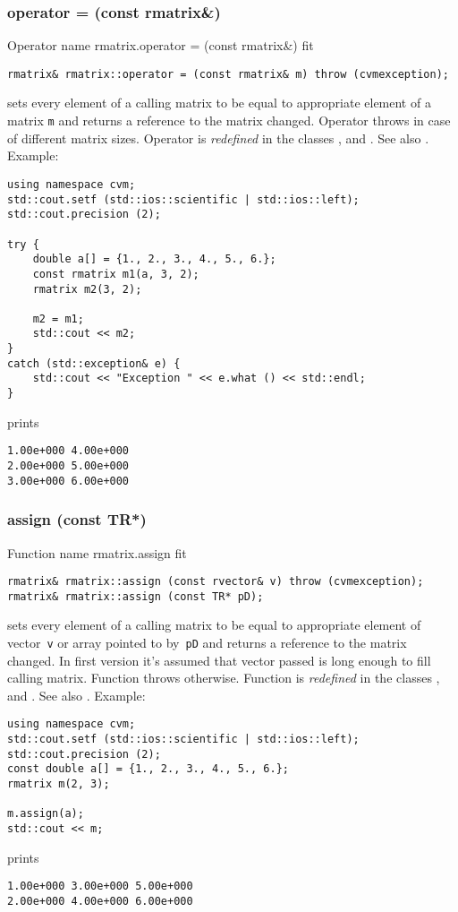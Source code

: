\subsubsection{operator = (const rmatrix\&)}
Operator%
\pdfdest name {rmatrix.operator = (const rmatrix&)} fit
\begin{verbatim}
rmatrix& rmatrix::operator = (const rmatrix& m) throw (cvmexception);
\end{verbatim}
sets  every element of a calling matrix to be equal to
appropriate element of a matrix \verb"m"
and returns a reference to
the matrix changed.
Operator throws 
in case of different matrix sizes.
Operator is \emph{redefined} in  the classes
, 
and .
See also .
Example:
\begin{Verbatim}
using namespace cvm;
std::cout.setf (std::ios::scientific | std::ios::left);
std::cout.precision (2);

try {
    double a[] = {1., 2., 3., 4., 5., 6.};
    const rmatrix m1(a, 3, 2);
    rmatrix m2(3, 2);

    m2 = m1;
    std::cout << m2;
}
catch (std::exception& e) {
    std::cout << "Exception " << e.what () << std::endl;
}
\end{Verbatim}
prints
\begin{Verbatim}
1.00e+000 4.00e+000
2.00e+000 5.00e+000
3.00e+000 6.00e+000
\end{Verbatim}
\newpage



\subsubsection{assign (const TR*)}
Function%
\pdfdest name {rmatrix.assign} fit
\begin{verbatim}
rmatrix& rmatrix::assign (const rvector& v) throw (cvmexception);
rmatrix& rmatrix::assign (const TR* pD);
\end{verbatim}
sets every element of a calling matrix to be equal to
appropriate element of  vector~\verb'v'
or array pointed to by~\verb"pD"
and returns a reference to
the matrix changed.
In first version it's assumed that vector passed is long
enough to fill calling matrix. Function throws  
otherwise.
Function is \emph{redefined} in the classes
, 
and .
See also .
Example:
\begin{Verbatim}
using namespace cvm;
std::cout.setf (std::ios::scientific | std::ios::left);
std::cout.precision (2);
const double a[] = {1., 2., 3., 4., 5., 6.};
rmatrix m(2, 3);

m.assign(a);
std::cout << m;
\end{Verbatim}
prints
\begin{Verbatim}
1.00e+000 3.00e+000 5.00e+000
2.00e+000 4.00e+000 6.00e+000
\end{Verbatim}
\newpage



